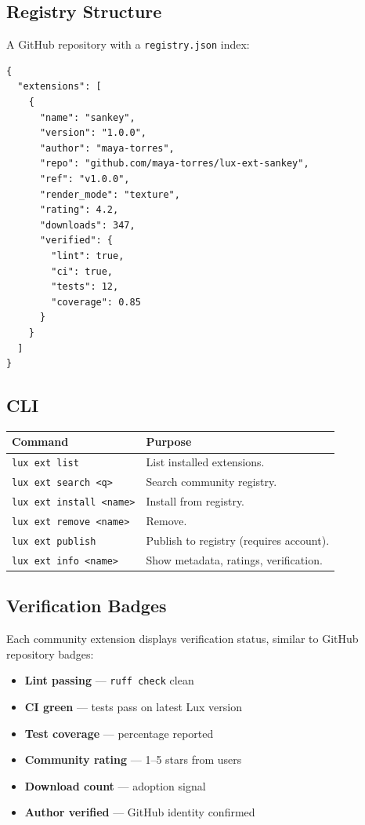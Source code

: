 \documentclass[a4paper,10pt]{article}
\begin{document}
\subsection{Registry Structure}

A GitHub repository with a \texttt{registry.json} index:

\begin{lstlisting}
{
  "extensions": [
    {
      "name": "sankey",
      "version": "1.0.0",
      "author": "maya-torres",
      "repo": "github.com/maya-torres/lux-ext-sankey",
      "ref": "v1.0.0",
      "render_mode": "texture",
      "rating": 4.2,
      "downloads": 347,
      "verified": {
        "lint": true,
        "ci": true,
        "tests": 12,
        "coverage": 0.85
      }
    }
  ]
}
\end{lstlisting}

\subsection{CLI}

\begin{center}
\begin{tabular}{@{}lp{8cm}@{}}
\toprule
\textbf{Command} & \textbf{Purpose} \\
\midrule
\texttt{lux ext list}      & List installed extensions. \\
\texttt{lux ext search <q>} & Search community registry. \\
\texttt{lux ext install <name>} & Install from registry. \\
\texttt{lux ext remove <name>}  & Remove. \\
\texttt{lux ext publish}   & Publish to registry (requires account). \\
\texttt{lux ext info <name>} & Show metadata, ratings, verification. \\
\bottomrule
\end{tabular}
\end{center}

\subsection{Verification Badges}

Each community extension displays verification status, similar to
GitHub repository badges:

\begin{itemize}[nosep]
  \item \textbf{Lint passing} --- \texttt{ruff check} clean
  \item \textbf{CI green} --- tests pass on latest Lux version
  \item \textbf{Test coverage} --- percentage reported
  \item \textbf{Community rating} --- 1--5 stars from users
  \item \textbf{Download count} --- adoption signal
  \item \textbf{Author verified} --- GitHub identity confirmed
\end{itemize}
\end{document}
